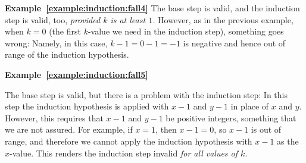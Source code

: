 \textbf{Example~\ref{example:induction:fall4}}
The base step is valid, and the induction step is valid, too,
\emph{provided $k$ is at least $1$.} However, as in the previous example, 
when $k=0$ (the first $k$-value we need in the induction step), something goes wrong:
Namely, in this case, $k-1=0-1=-1$ is negative and hence out of range of 
the induction hypothesis.

\textbf{Example~\ref{example:induction:fall5}}

The base step is valid, 
but there is a problem with the induction step: In this step
the induction hypothesis is applied with $x-1$ and $y-1$ in place
of $x$ and $y$. However, this requires that $x-1$ and $y-1$ be positive
integers, something that we are not assured.
For example, if $x=1$, then $x-1=0$, so $x-1$ is out of range, and therefore we
cannot apply the induction hypothesis with $x-1$ as the $x$-value. 
This renders the induction step invalid \emph{for all values of $k$}.








